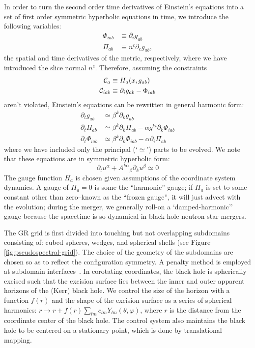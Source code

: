 In order to turn the second order time derivatives of Einstein's equations into a set of first order symmetric hyperbolic equations in time, we introduce the following variables:
\begin{align}
\Phi_{iab} &\equiv \partial_i g_{ab} \\
\Pi_{ab} &\equiv n^c \partial_c g_{ab},
\end{align}
the spatial and time derivatives of the metric, respectively, where we have introduced the slice normal $n^c$.  
Therefore, assuming the constraints
\begin{align}
{\cal{C}}_a &\equiv H_a (x, g_{ab} )  \\
{\cal{C}}_{iab} &\equiv \partial_i g_{ab} - \Phi_{iab} 
\end{align}
aren't violated, Einstein's equations can be rewritten in general harmonic form:
\begin{align}
\partial_t g_{ab} &\simeq \beta^k \partial_k g_{ab} \\
\partial_t \Pi_{ab} &\simeq \beta^k \partial_k \Pi_{ab} - \alpha g^{ki} \partial_k \Phi_{iab} \\
\partial_t \Phi_{iab} &\simeq \beta^k \partial_k \Phi_{iab} - \alpha  \partial_i \Pi_{ab}
\end{align}
where we have included only the principal (`$\simeq$') parts to be evolved.  We note that these equations are in symmetric hyperbolic form:
\begin{equation}
\partial_t u^\alpha + {A^{k\alpha}}_\beta \partial_k u^\beta \simeq 0
\end{equation}
The gauge function $H_a$ is chosen given assumptions of the coordinate system dynamics.  
A gauge of $H_a = 0$ is some the ``harmonic'' gauge; 
if $H_a$ is set to some constant other than zero--known as the ``frozen gauge'', it will just advect with the evolution;
during the merger, we generally roll-on a `damped-harmonic'' gauge because the spacetime is so dynamical in black hole-neutron star mergers.

The GR grid is first divided into touching but not overlapping subdomains consisting of: cubed spheres, wedges, and spherical shells (see Figure \ref{fig:pseudospectral-grid}).
The choice of the geometry of the subdomains are chosen so as to reflect the configuration symmetry.  
A penalty method is employed at subdomain interfaces~\cite{Hesthaven1999,Hesthaven2000,Gottlieb2001,Hesthaven1997}.  
In corotating coordinates, the black hole is spherically excised such that the excision surface lies between the inner and outer apparent horizons of the (Kerr) black hole. 
We control the size of the horizon with a function $f(r)$ and the shape of the excision surface as a series of spherical harmonics: $r \rightarrow r + f(r) \sum_{lm} { c_{lm} Y_{lm}(\theta, \varphi) }$, where $r$ is the distance from the coordinate center of the black hole.
The control system also maintains the black hole to be centered on a stationary point, which is done by translational mapping.  

